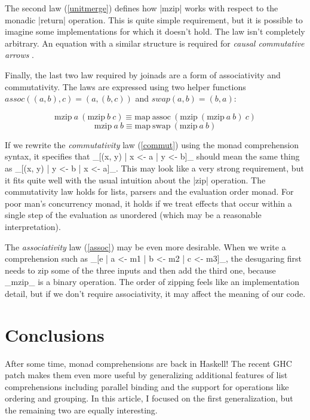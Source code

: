\documentclass{tmr}
\begin{document}
The second law (\ref{unitmerge}) defines how |mzip| works with respect to the monadic |return|
operation. This is quite simple requirement, but it is possible to imagine some implementations 
for which it doesn't hold. The law isn't completely arbitrary. An equation with a similar structure
is required for \textit{causal commutative arrows} \cite{causalarr}.

Finally, the last two law required by joinads are a form of associativity and commutativity. The 
laws are expressed using two helper functions $assoc((a,b),c)=(a,(b,c))$ and $swap(a,b)=(b,a)$:

\begin{equation}
  \text{mzip} \: a \: (\text{mzip} \: b \: c) \equiv \text{map} \: \text{assoc} \: (\text{mzip} \: (\text{mzip} \: a \: b) \: c) 
  \label{commut}
\end{equation}
\begin{equation}
  \text{mzip} \: a \: b \equiv \text{map} \: \text{swap} \: (\text{mzip} \: a \: b)
  \label{assoc}
\end{equation}

\UndefineShortVerb{\|}
\DefineShortVerb{\_}

If we rewrite the \textit{commutativity} law (\ref{commut}) using the monad comprehension syntax, it 
specifies that _[(x, y) | x <- a | y <- b]_ should mean the same thing as _[(x, y) | y <- b | x <- a]_. 
This may look like a very strong requirement, but it fits quite well with the usual intuition about 
the |zip| operation. The commutativity law holds for lists, parsers and the evaluation order monad.
For poor man's concurrency monad, it holds if we treat effects that occur within a single step 
of the evaluation as unordered (which may be a reasonable interpretation).

The \textit{associativity} law (\ref{assoc}) may be even more desirable. When we write a 
comprehension such as _[e | a <- m1 | b <- m2 | c <- m3]_, the desugaring first needs to zip some
of the three inputs and then add the third one, because _mzip_ is a binary operation. The order
of zipping feels like an implementation detail, but if we don't require associativity, it may 
affect the meaning of our code.

\UndefineShortVerb{\_}
\DefineShortVerb{\|}


\section{Conclusions}
After some time, monad comprehensions are back in Haskell! The recent GHC patch makes them even 
more useful by generalizing additional features of list comprehensions including parallel binding 
and the support for operations like ordering and grouping. In this article, I focused on the first 
generalization, but the remaining two are equally interesting.
\end{document}
